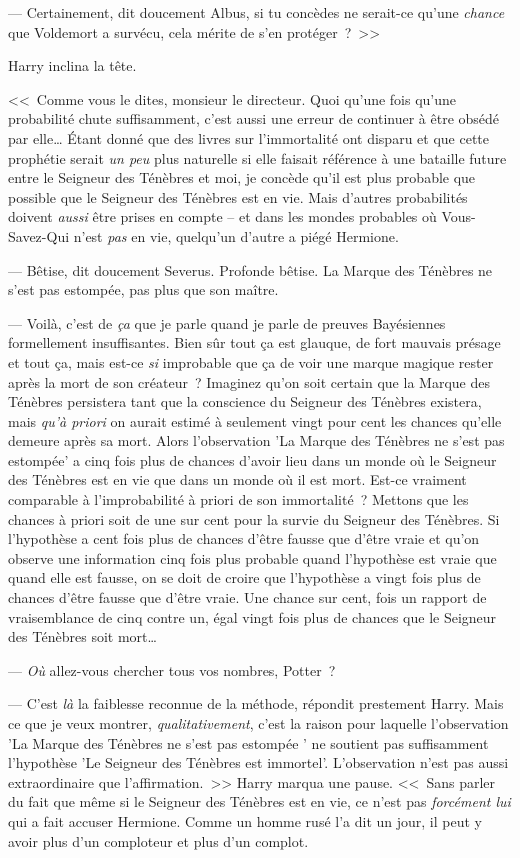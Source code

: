 --- Certainement, dit doucement Albus, si tu concèdes ne serait-ce qu'une \emph{chance} que Voldemort a survécu, cela mérite de s'en protéger~?~>>

Harry inclina la tête.

<<~Comme vous le dites, monsieur le directeur. Quoi qu'une fois qu'une probabilité chute suffisamment, c'est aussi une erreur de continuer à être obsédé par elle… Étant donné que des livres sur l'immortalité ont disparu et que cette prophétie serait \emph{un peu} plus naturelle si elle faisait référence à une bataille future entre le Seigneur des Ténèbres et moi, je concède qu'il est plus probable que possible que le Seigneur des Ténèbres est en vie. Mais d'autres probabilités doivent \emph{aussi} être prises en compte -- et dans les mondes probables où Vous-Savez-Qui n'est \emph{pas} en vie, quelqu'un d'autre a piégé Hermione.

--- Bêtise, dit doucement Severus. Profonde bêtise. La Marque des Ténèbres ne s'est pas estompée, pas plus que son maître.

--- Voilà, c'est de \emph{ça} que je parle quand je parle de preuves Bayésiennes formellement insuffisantes. Bien sûr tout ça est glauque, de fort mauvais présage et tout ça, mais est-ce \emph{si} improbable que ça de voir une marque magique rester après la mort de son créateur~? Imaginez qu'on soit certain que la Marque des Ténèbres persistera tant que la conscience du Seigneur des Ténèbres existera, mais \emph{qu'à priori} on aurait estimé à seulement vingt pour cent les chances qu'elle demeure après sa mort. Alors l'observation 'La Marque des Ténèbres ne s'est pas estompée' a cinq fois plus de chances d'avoir lieu dans un monde où le Seigneur des Ténèbres est en vie que dans un monde où il est mort. Est-ce vraiment comparable à l'improbabilité à priori de son immortalité~? Mettons que les chances à priori soit de une sur cent pour la survie du Seigneur des Ténèbres. Si l'hypothèse a cent fois plus de chances d'être fausse que d'être vraie et qu'on observe une information cinq fois plus probable quand l'hypothèse est vraie que quand elle est fausse, on se doit de croire que l'hypothèse a vingt fois plus de chances d'être fausse que d'être vraie. Une chance sur cent, fois un rapport de vraisemblance de cinq contre un, égal vingt fois plus de chances que le Seigneur des Ténèbres soit mort…

--- \emph{Où} allez-vous chercher tous vos nombres, Potter~?

--- C'est \emph{là} la faiblesse reconnue de la méthode, répondit prestement Harry. Mais ce que je veux montrer, \emph{qualitativement}, c'est la raison pour laquelle l'observation 'La Marque des Ténèbres ne s'est pas estompée ' ne soutient pas suffisamment l'hypothèse 'Le Seigneur des Ténèbres est immortel'. L'observation n'est pas aussi extraordinaire que l'affirmation.~>> Harry marqua une pause. <<~Sans parler du fait que même si le Seigneur des Ténèbres est en vie, ce n'est pas \emph{forcément lui} qui a fait accuser Hermione. Comme un homme rusé l'a dit un jour, il peut y avoir plus d'un comploteur et plus d'un complot.

